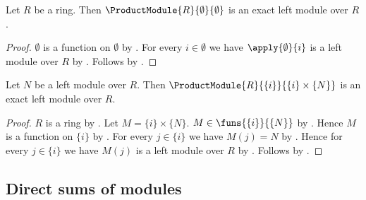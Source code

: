 \begin{proposition}\label{spike_empty_product_module_is_exact}
    Let $R$ be a ring.
    Then $\ProductModule{R}{\emptyset}{\emptyset}$
        is an exact left module over $R$.
\end{proposition}
\begin{proof}
    $\emptyset$ is a function on $\emptyset$ by
        .
    For every $i\in\emptyset$ we have
        $\apply{\emptyset}{i}$ is a left module over $R$ by
        .
    Follows by .
\end{proof}

\begin{proposition}\label{spike_singleton_product_module_is_exact}
    Let $N$ be a left module over $R$.
    Then
        $\ProductModule{R}{\{i\}}{\{i\}\times\{N\}}$
        is an exact left module over $R$.
\end{proposition}
\begin{proof}
    $R$ is a ring by .
    Let $M=\{i\}\times\{N\}$.
    $M\in\funs{\{i\}}{\{N\}}$ by .
    Hence $M$ is a function on $\{i\}$ by
        .
    For every $j\in\{i\}$ we have $M(j)=N$ by
        .
    Hence for every $j\in\{i\}$ we have
        $M(j)$ is a left module over $R$ by \auto.
    Follows by .
\end{proof}

\subsection{Direct sums of modules}

